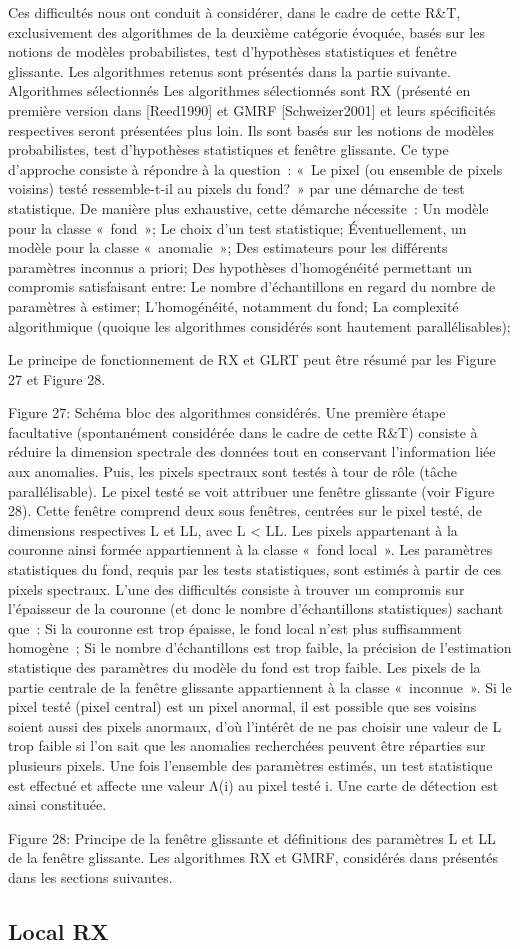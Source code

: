 Ces difficultés nous ont conduit à considérer, dans le cadre de cette R&T, exclusivement des algorithmes de la deuxième catégorie évoquée, basés sur les notions de modèles probabilistes, test d’hypothèses statistiques et fenêtre glissante. Les algorithmes retenus sont présentés dans la partie suivante.
Algorithmes sélectionnés
Les algorithmes sélectionnés sont RX (présenté en première version dans [Reed1990] et GMRF [Schweizer2001] et leurs spécificités respectives seront présentées plus loin. Ils sont basés sur les notions de modèles probabilistes, test d’hypothèses statistiques et fenêtre glissante.
Ce type d’approche consiste à répondre à la question : « Le pixel (ou ensemble de pixels voisins) testé ressemble-t-il au pixels du fond? » par une démarche de test statistique. De manière plus exhaustive, cette démarche nécessite :
Un modèle pour la classe « fond »;
Le choix d’un test statistique;
Éventuellement, un modèle pour la classe « anomalie »;
Des estimateurs pour les différents paramètres inconnus a priori;
Des hypothèses d’homogénéité permettant un compromis satisfaisant entre:
Le nombre d’échantillons en regard du nombre de paramètres à estimer;
L’homogénéité, notamment du fond;
La complexité algorithmique (quoique les algorithmes considérés sont hautement parallélisables);

Le principe de fonctionnement de RX et GLRT peut être résumé par les Figure 27 et Figure 28.

Figure 27: Schéma bloc des algorithmes considérés.
Une première étape facultative (spontanément considérée dans le cadre de cette R&T) consiste à réduire la dimension spectrale des données tout en conservant l’information liée aux anomalies. Puis, les pixels spectraux sont testés à tour de rôle (tâche parallélisable). Le pixel testé se voit attribuer une fenêtre glissante (voir Figure 28). Cette fenêtre comprend deux sous fenêtres, centrées sur le pixel testé, de dimensions respectives L et LL, avec L < LL.
Les pixels appartenant à la couronne ainsi formée appartiennent à la classe « fond local ». Les paramètres statistiques du fond, requis par les tests statistiques, sont estimés à partir de ces pixels spectraux. L’une des difficultés consiste à trouver un compromis sur l’épaisseur de la couronne (et donc le nombre d’échantillons statistiques) sachant que :
Si la couronne est trop épaisse, le fond local n’est plus suffisamment homogène ;
Si le nombre d’échantillons est trop faible, la précision de l’estimation statistique des paramètres du modèle du fond est trop faible.
Les pixels de la partie centrale de la fenêtre glissante appartiennent à la classe « inconnue ». Si le pixel testé (pixel central) est un pixel anormal, il est possible que ses voisins soient aussi des pixels anormaux, d’où l’intérêt de ne pas choisir une valeur de L trop faible si l’on sait que les anomalies recherchées peuvent être réparties sur plusieurs pixels.
Une fois l’ensemble des paramètres estimés, un test statistique est effectué et affecte une valeur Λ(i) au pixel testé i. Une carte de détection est ainsi constituée.

Figure 28: Principe de la fenêtre glissante et définitions des paramètres L et LL de la fenêtre glissante.
Les algorithmes RX et GMRF, considérés dans présentés dans les sections suivantes.

\subsection{Local RX}
